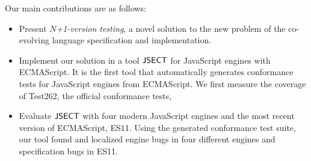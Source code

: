 Our main contributions are as follows:
\begin{itemize}
  \item Present \textit{$N$+1-version testing}, a novel solution to the new
    problem of the co-evolving language specification and implementation.
  \item Implement our solution in a tool $\text{\sf JSECT}$ for JavaScript engines with
    ECMAScript.  It is the first tool that automatically generates conformance
    tests for JavaScript engines from ECMAScript.  We first measure the coverage
    of Test262, the official conformance tests, 
  \item Evaluate $\text{\sf JSECT}$ with four modern JavaScript engines and the most recent
    version of ECMAScript, ES11.  Using the generated conformance test
    suite, our tool found and localized  engine bugs in four different
    engines and  specification bugs in ES11.
\end{itemize}
